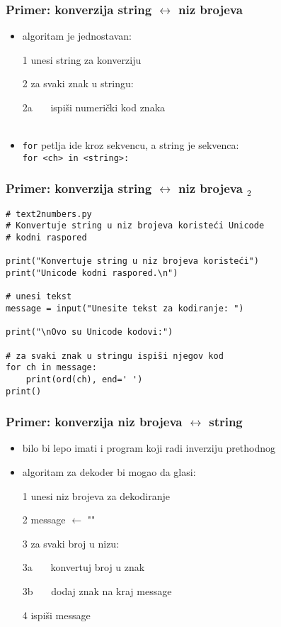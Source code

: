 \documentclass[utf8,compress]{beamer}
\begin{document}
\begin{frame}[fragile]
  \frametitle{Primer: konverzija string $\leftrightarrow$ niz brojeva}
  \begin{itemize}
    \item algoritam je jednostavan:
    \item[1] unesi string za konverziju
    \item[2] za svaki znak u stringu:
    \item[2a] \ \ \ ispiši numerički kod znaka \\ \ \\ %
    \item \texttt{for} petlja ide kroz sekvencu, a string je sekvenca: \\
      \texttt{for <ch> in <string>:}
  \end{itemize}
\end{frame}

\begin{frame}[fragile,shrink=10]
  \frametitle{Primer: konverzija string $\leftrightarrow$ niz brojeva $_2$}
\begin{verbatim}
# text2numbers.py
# Konvertuje string u niz brojeva koristeći Unicode
# kodni raspored

print("Konvertuje string u niz brojeva koristeći")
print("Unicode kodni raspored.\n")

# unesi tekst
message = input("Unesite tekst za kodiranje: ")

print("\nOvo su Unicode kodovi:")

# za svaki znak u stringu ispiši njegov kod
for ch in message:
    print(ord(ch), end=' ')
print()
\end{verbatim}
\end{frame}

\begin{frame}[fragile]
  \frametitle{Primer: konverzija niz brojeva $\leftrightarrow$ string}
  \begin{itemize}
    \item bilo bi lepo imati i program koji radi inverziju prethodnog
    \item algoritam za dekoder bi mogao da glasi:
    \item[1] unesi niz brojeva za dekodiranje
    \item[2] message $\leftarrow$ ""
    \item[3] za svaki broj u nizu:
    \item[3a] \ \ \ konvertuj broj u znak
    \item[3b] \ \ \ dodaj znak na kraj message
    \item[4] ispiši message
  \end{itemize}
\end{frame}
\end{document}
